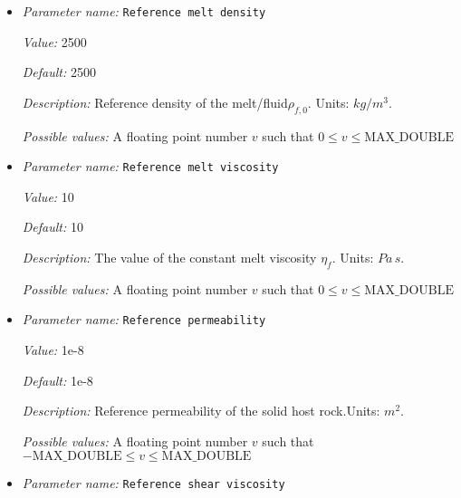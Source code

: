 \begin{itemize}
{\it Default:} 1e22


{\it Description:} The value of the constant bulk viscosity $\xi_0$ of the solid matrix. This viscosity may be modified by both temperature and porosity dependencies. Units: $Pa \, s$.


{\it Possible values:} A floating point number $v$ such that $0 \leq v \leq \text{MAX\_DOUBLE}$
\item {\it Parameter name:} {\tt Reference melt density}
\label{parameters:Material model/Melt global/Reference melt density}


{\it Value:} 2500


{\it Default:} 2500


{\it Description:} Reference density of the melt/fluid$\rho_{f,0}$. Units: $kg/m^3$.


{\it Possible values:} A floating point number $v$ such that $0 \leq v \leq \text{MAX\_DOUBLE}$
\item {\it Parameter name:} {\tt Reference melt viscosity}
\label{parameters:Material model/Melt global/Reference melt viscosity}


{\it Value:} 10


{\it Default:} 10


{\it Description:} The value of the constant melt viscosity $\eta_f$. Units: $Pa \, s$.


{\it Possible values:} A floating point number $v$ such that $0 \leq v \leq \text{MAX\_DOUBLE}$
\item {\it Parameter name:} {\tt Reference permeability}
\label{parameters:Material model/Melt global/Reference permeability}


{\it Value:} 1e-8


{\it Default:} 1e-8


{\it Description:} Reference permeability of the solid host rock.Units: $m^2$.


{\it Possible values:} A floating point number $v$ such that $-\text{MAX\_DOUBLE} \leq v \leq \text{MAX\_DOUBLE}$
\item {\it Parameter name:} {\tt Reference shear viscosity}
\label{parameters:Material model/Melt global/Reference shear viscosity}



\end{itemize}
